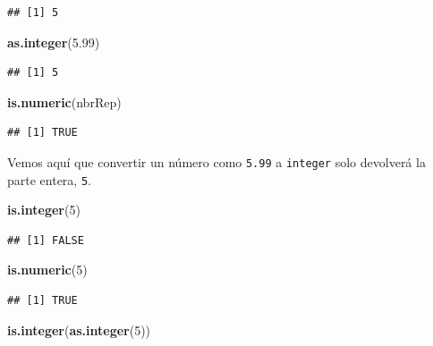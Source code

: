 \documentclass[
]{book}
\newenvironment{Shaded}{\begin{snugshade}}{\end{snugshade}}
\newcommand{\DecValTok}[1]{\textcolor[rgb]{0.00,0.00,0.81}{#1}}
\newcommand{\FloatTok}[1]{\textcolor[rgb]{0.00,0.00,0.81}{#1}}
\newcommand{\KeywordTok}[1]{\textcolor[rgb]{0.13,0.29,0.53}{\textbf{#1}}}
\newcommand{\NormalTok}[1]{#1}
\begin{document}
\begin{verbatim}
## [1] 5
\end{verbatim}

\begin{Shaded}
\begin{Highlighting}[]
\KeywordTok{as.integer}\NormalTok{(}\FloatTok{5.99}\NormalTok{)}
\end{Highlighting}
\end{Shaded}

\begin{verbatim}
## [1] 5
\end{verbatim}

\begin{Shaded}
\begin{Highlighting}[]
\KeywordTok{is.numeric}\NormalTok{(nbrRep)}
\end{Highlighting}
\end{Shaded}

\begin{verbatim}
## [1] TRUE
\end{verbatim}

Vemos aquí que convertir un número como \texttt{5.99} a \texttt{integer} solo devolverá la parte entera, \texttt{5}.

\begin{Shaded}
\begin{Highlighting}[]
\KeywordTok{is.integer}\NormalTok{(}\DecValTok{5}\NormalTok{)}
\end{Highlighting}
\end{Shaded}

\begin{verbatim}
## [1] FALSE
\end{verbatim}

\begin{Shaded}
\begin{Highlighting}[]
\KeywordTok{is.numeric}\NormalTok{(}\DecValTok{5}\NormalTok{)}
\end{Highlighting}
\end{Shaded}

\begin{verbatim}
## [1] TRUE
\end{verbatim}

\begin{Shaded}
\begin{Highlighting}[]
\KeywordTok{is.integer}\NormalTok{(}\KeywordTok{as.integer}\NormalTok{(}\DecValTok{5}\NormalTok{))}
\end{Highlighting}
\end{Shaded}
\end{document}
